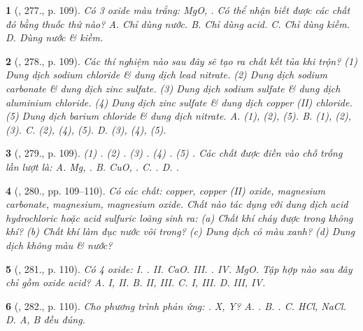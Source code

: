 \documentclass{article}
\newtheorem{baitoan}{}
\begin{document}
\begin{baitoan}[\cite{Nguyen_Buu_Can_500_BT_Hoa_Hoc_THCS}, 277., p. 109]
	Có 3 oxide màu trắng: {\rm MgO, }. Có thể nhận biết được các chất đó bằng thuốc thử nào? {\sf A.} Chỉ dùng nước. {\sf B.} Chỉ dùng acid. {\sf C.} Chỉ dùng kiềm. {\sf D.} Dùng nước \& kiềm.
\end{baitoan}

\begin{baitoan}[\cite{Nguyen_Buu_Can_500_BT_Hoa_Hoc_THCS}, 278., p. 109]
	Các thí nghiệm nào sau đây sẽ tạo ra chất kết tủa khi trộn? (1) Dung dịch sodium chloride \& dung dịch lead nitrate. (2) Dung dịch sodium carbonate \& dung dịch zinc sulfate. (3) Dung dịch sodium sulfate \& dung dịch aluminium chloride. (4) Dung dịch zinc sulfate \& dung dịch copper ({\rm II}) chloride. (5) Dung dịch barium chloride \& dung dịch nitrate. {\sf A.} (1), (2), (5). {\sf B.} (1), (2), (3). {\sf C.} (2), (4), (5). {\sf D.} (3), (4), (5).
\end{baitoan}

\begin{baitoan}[\cite{Nguyen_Buu_Can_500_BT_Hoa_Hoc_THCS}, 279., p. 109]
	{\rm(1) . (2) . (3) . (4) . (5) .} Các chất được điền vào chỗ trống lần lượt là: {\rm{\sf A.} Mg, . {\sf B.} CuO, . {\sf C.} . {\sf D.} .}
\end{baitoan}

\begin{baitoan}[\cite{Nguyen_Buu_Can_500_BT_Hoa_Hoc_THCS}, 280., pp. 109--110]
	Có các chất: copper, copper ({\rm II}) oxide, magnesium carbonate, magnesium, magnesium oxide. Chất nào tác dụng với dung dịch acid hydrochloric hoặc acid sulfuric loãng sinh ra: (a) Chất khí cháy được trong không khí? (b) Chất khí làm đục nước vôi trong? (c) Dung dịch có màu xanh? (d) Dung dịch không màu \& nước?
\end{baitoan}

\begin{baitoan}[\cite{Nguyen_Buu_Can_500_BT_Hoa_Hoc_THCS}, 281., p. 110]
	Có 4 oxide: {\rm I. . II. CaO. III. . IV. MgO}. Tập hợp nào sau đây chỉ gồm oxide acid? {\rm{\sf A.} I, II. {\sf B.} II, III. {\sf C.} I, III. {\sf D.} III, IV}.
\end{baitoan}

\begin{baitoan}[\cite{Nguyen_Buu_Can_500_BT_Hoa_Hoc_THCS}, 282., p. 110]
	Cho phương trình phản ứng: {\rm{}}. X, Y? {\rm{\sf A.} . {\sf B.} . {\sf C.} HCl, NaCl. {\sf D.} A, B đều đúng.}
\end{baitoan}
\end{document}
